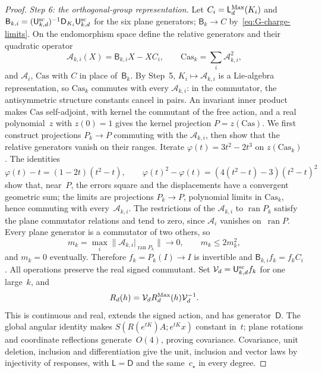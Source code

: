 \begin{proof}
\emph{Step 6: the orthogonal-group representation.} Let $C_i=\mathsf L_d^{\rm Max}(K_i)$ and $\mathsf B_{k,i}=(\mathsf{U}_{k,d}^{\mathrm{sc}})^{-1}\mathsf D_{K_i}\mathsf{U}_{k,d}^{\mathrm{sc}}$ for the six plane generators; $\mathsf B_k\to C$ by~\eqref{eq:G-charge-limits}. On the endomorphism space define the relative generators and their quadratic operator
\begin{equation*}
\mathcal A_{k,i}(X)=\mathsf B_{k,i}X-XC_i,\qquad \mathrm{Cas}_k=\sum_i\mathcal A_{k,i}^2,
\end{equation*}
and $\mathcal A_i$, $\mathrm{Cas}$ with $C$ in place of~$\mathsf B_k$. By Step~5, $K_i\mapsto\mathcal A_{k,i}$ is a Lie-algebra representation, so $\mathrm{Cas}_k$ commutes with every $\mathcal A_{k,i}$: in the commutator, the antisymmetric structure constants cancel in pairs. An invariant inner product makes $\mathrm{Cas}$ self-adjoint, with kernel the commutant of the free action, and a real polynomial~$z$ with $z(0)=1$ gives the kernel projection $P=z(\mathrm{Cas})$. We first construct projections $P_k\to P$ commuting with the $\mathcal A_{k,i}$, then show that the relative generators vanish on their ranges. Iterate $\varphi(t)=3t^2-2t^3$ on $z(\mathrm{Cas}_k)$. The identities
\begin{equation*}
\varphi(t)-t=(1-2t)(t^2-t),\qquad
\varphi(t)^2-\varphi(t)=(4(t^2-t)-3)(t^2-t)^2
\end{equation*}
show that, near~$P$, the errors square and the displacements have a convergent geometric sum; the limits are projections $P_k\to P$, polynomial limits in $\mathrm{Cas}_k$, hence commuting with every~$\mathcal A_{k,i}$. The restrictions of the $\mathcal A_{k,i}$ to $\operatorname{ran}P_k$ satisfy the plane commutator relations and tend to zero, since $\mathcal A_i$ vanishes on~$\operatorname{ran}P$. Every plane generator is a commutator of two others, so
\begin{equation*}
m_k=\max_i\|\mathcal A_{k,i}|_{\operatorname{ran}P_k}\|\longrightarrow0,
\qquad m_k\le2m_k^2,
\end{equation*}
and $m_k=0$ eventually. Therefore $f_k=P_k(I)\to I$ is invertible and $\mathsf B_{k,i}f_k=f_kC_i$. All operations preserve the real signed commutant. Set $\mathcal V_d=\mathsf{U}_{k,d}^{\mathrm{sc}}f_k$ for one large~$k$, and
\begin{equation*}
R_d(h)=\mathcal V_d R_d^{\rm Max}(h)\mathcal V_d^{-1}.
\end{equation*}
This is continuous and real, extends the signed action, and has generator~$\mathsf D$. The global angular identity makes $S(R(e^{tK})A;e^{tK}x)$ constant in~$t$; plane rotations and coordinate reflections generate~$O(4)$, proving covariance. Covariance, unit deletion, inclusion and differentiation give the unit, inclusion and vector laws by injectivity of responses, with $\mathsf L=\mathsf D$ and the same~$c_\star$ in every degree.
\end{proof}

